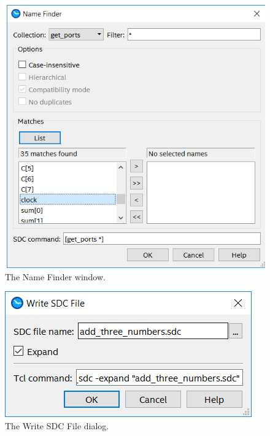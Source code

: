 \documentclass[11pt, twoside, pdftex]{article}
\begin{document}
\begin{figure}[H]
\begin{center}
\includegraphics[scale=0.55]{figures/setconstraint2.png}
\end{center}
\caption{The Name Finder window.}
\label{fig:setconstraint2}
\end{figure}

\begin{figure}[H]
\begin{center}
\includegraphics[scale=0.55]{figures/setconstraint4.png}
\end{center}
\caption{The Write SDC File dialog.}
\label{fig:setconstraint4}
\end{figure}
\end{document}
